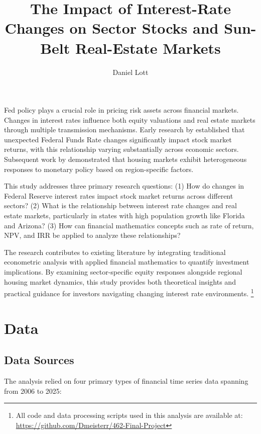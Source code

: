 \documentclass[12pt, stu, abstract]{apa7}
\title{The Impact of Interest-Rate Changes on Sector Stocks and Sun-Belt Real-Estate Markets}
\author{Daniel Lott}
\begin{document}
\maketitle

Fed policy plays a crucial role in pricing risk assets across financial markets. Changes in interest rates influence both equity valuations and real estate markets through multiple transmission mechanisms. Early research by \textcite{bernanke2005} established that unexpected Federal Funds Rate changes significantly impact stock market returns, with this relationship varying substantially across economic sectors. Subsequent work by \textcite{giuliodori2005} demonstrated that housing markets exhibit heterogeneous responses to monetary policy based on region-specific factors.

This study addresses three primary research questions: (1) How do changes in Federal Reserve interest rates impact stock market returns across different sectors? (2) What is the relationship between interest rate changes and real estate markets, particularly in states with high population growth like Florida and Arizona? (3) How can financial mathematics concepts such as rate of return, NPV, and IRR be applied to analyze these relationships?

The research contributes to existing literature by integrating traditional econometric analysis with applied financial mathematics to quantify investment implications. By examining sector-specific equity responses alongside regional housing market dynamics, this study provides both theoretical insights and practical guidance for investors navigating changing interest rate environments. \footnote{All code and data processing scripts used in this analysis are available at: \url{https://github.com/Dmeisterr/462-Final-Project}}

\section{Data}
\subsection{Data Sources}
The analysis relied on four primary types of financial time series data spanning from 2006 to 2025:
\end{document}
